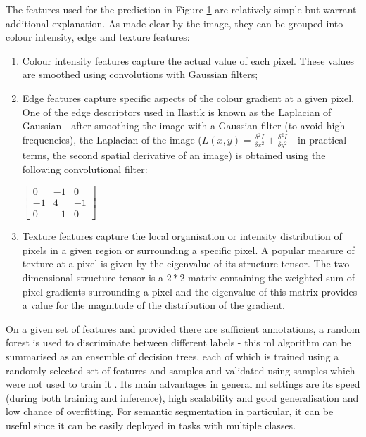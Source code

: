 \begin{figure}
	\label{fig:segmentation-example}
\end{figure}

The features used for the prediction in Figure \ref{fig:segmentation-example} are relatively simple but warrant additional explanation. As made clear by the image, they can be grouped into colour intensity, edge and texture features:

\begin{enumerate}
	\item Colour intensity features capture the actual value of each pixel. These values are smoothed using convolutions with Gaussian filters;
	\item Edge features capture specific aspects of the colour gradient at a given pixel. One of the edge descriptors used in Ilastik is known as the Laplacian of Gaussian - after smoothing the image with a Gaussian filter (to avoid high frequencies), the Laplacian of the image ($L(x,y) = \frac{\delta^2I}{\delta x^2} + \frac{\delta^2I}{\delta y^2}$ - in practical terms, the second spatial derivative of an image) is obtained using the following convolutional filter:
	
			\begin{center}
				$\begin{bmatrix}0 & -1 & 0\\-1 & 4 & -1\\0 & -1 & 0\end{bmatrix}$
			\end{center}
	
	\item Texture features capture the local organisation or intensity distribution of pixels in a given region or surrounding a specific pixel. A popular measure of texture at a pixel is given by the eigenvalue of its structure tensor. The two-dimensional structure tensor is a $2*2$ matrix containing the weighted sum of pixel gradients surrounding a pixel and the eigenvalue of this matrix provides a value for the magnitude of the distribution of the gradient.
	
\end{enumerate}

On a given set of features and provided there are sufficient annotations, a random forest is used to discriminate between different labels - this \ac{ml} algorithm can be summarised as an ensemble of decision trees, each of which is trained using a randomly selected set of features and samples and validated using samples which were not used to train it \cite{Breiman2001-yz}. Its main advantages in general \ac{ml} settings are its speed (during both training and inference), high scalability and good generalisation and low chance of overfitting. For semantic segmentation in particular, it can be useful since it can be easily deployed in tasks with multiple classes.

